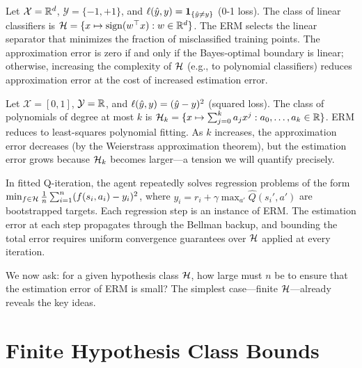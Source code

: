 \documentclass[11pt,a4paper]{article}
\begin{document}
\begin{example}
\label{ex:linear_classifiers}
Let $\mathcal{X} = \mathbb{R}^d$, $\mathcal{Y} = \{-1, +1\}$, and
$\ell(\hat{y}, y) = \mathbf{1}_{\{\hat{y} \neq y\}}$ (0-1 loss).
The class of linear classifiers is
$\mathcal{H} = \{x \mapsto \operatorname{sign}(w^\top x) : w \in \mathbb{R}^d\}$.
The ERM selects the linear separator that minimizes the fraction
of misclassified training points.  The approximation error is zero
if and only if the Bayes-optimal boundary is linear; otherwise,
increasing the complexity of $\mathcal{H}$ (e.g., to polynomial
classifiers) reduces approximation error at the cost of increased
estimation error.
\end{example}

\begin{example}
\label{ex:poly_regression}
Let $\mathcal{X} = [0, 1]$, $\mathcal{Y} = \mathbb{R}$, and
$\ell(\hat{y}, y) = (\hat{y} - y)^2$ (squared loss).  The class
of polynomials of degree at most $k$ is
$\mathcal{H}_k = \{x \mapsto \sum_{j=0}^k a_j x^j : a_0, \ldots, a_k
\in \mathbb{R}\}$.  ERM reduces to least-squares polynomial fitting.  As $k$
increases, the approximation error decreases (by the Weierstrass
approximation theorem), but the estimation error grows because
$\mathcal{H}_k$ becomes larger---a tension we will quantify precisely.
\end{example}

\begin{rlconnection}[title={ERM in Reinforcement Learning}]
In fitted Q-iteration, the agent repeatedly solves regression problems
of the form $\min_{f \in \mathcal{H}} \frac{1}{n}\sum_{i=1}^n
(f(s_i, a_i) - y_i)^2$, where $y_i = r_i + \gamma \max_{a'}
\hat{Q}(s_i', a')$ are bootstrapped targets.  Each regression step
is an instance of ERM.  The estimation error at each step propagates
through the Bellman backup, and bounding the total error requires
uniform convergence guarantees over $\mathcal{H}$ applied at every
iteration.
\end{rlconnection}

We now ask: for a given hypothesis class $\mathcal{H}$, how large must
$n$ be to ensure that the estimation error of ERM is small?  The
simplest case---finite $\mathcal{H}$---already reveals the key ideas.


\section{Finite Hypothesis Class Bounds}
\label{sec:finite_class}
\end{document}
